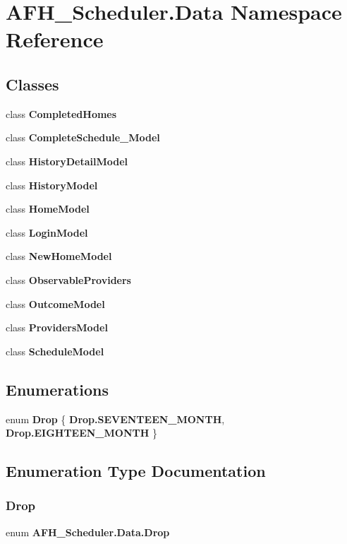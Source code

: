 \section{A\+F\+H\+\_\+\+Scheduler.\+Data Namespace Reference}
\label{namespace_a_f_h___scheduler_1_1_data}
\subsection*{Classes}
\begin{DoxyCompactItemize}
\item 
class \textbf{ Completed\+Homes}
\item 
class \textbf{ Complete\+Schedule\+\_\+\+Model}
\item 
class \textbf{ History\+Detail\+Model}
\item 
class \textbf{ History\+Model}
\item 
class \textbf{ Home\+Model}
\item 
class \textbf{ Login\+Model}
\item 
class \textbf{ New\+Home\+Model}
\item 
class \textbf{ Observable\+Providers}
\item 
class \textbf{ Outcome\+Model}
\item 
class \textbf{ Providers\+Model}
\item 
class \textbf{ Schedule\+Model}
\end{DoxyCompactItemize}
\subsection*{Enumerations}
\begin{DoxyCompactItemize}
\item 
enum \textbf{ Drop} \{ \textbf{ Drop.\+S\+E\+V\+E\+N\+T\+E\+E\+N\+\_\+\+M\+O\+N\+TH}, 
\textbf{ Drop.\+E\+I\+G\+H\+T\+E\+E\+N\+\_\+\+M\+O\+N\+TH}
 \}
\end{DoxyCompactItemize}


\subsection{Enumeration Type Documentation}
\mbox{\label{namespace_a_f_h___scheduler_1_1_data_a1aa3150d55d64547437bda1312faa20a}} 
\subsubsection{Drop}
{\footnotesize\ttfamily enum \textbf{ A\+F\+H\+\_\+\+Scheduler.\+Data.\+Drop}\hspace{0.3cm}{\ttfamily [strong]}}

